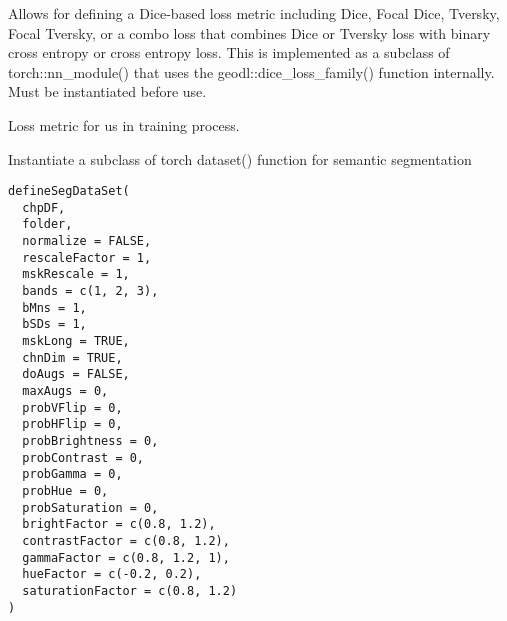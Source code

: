 \documentclass[a4paper]{book}
\begin{document}
%
\begin{Details}\relax
Allows for defining a Dice-based loss metric including Dice, Focal Dice,
Tversky, Focal Tversky, or a combo loss that combines Dice or Tversky loss
with binary cross entropy or cross entropy loss. This is implemented as a subclass
of torch::nn\_module() that uses the geodl::dice\_loss\_family() function internally. Must be
instantiated before use.
\end{Details}
%
\begin{Value}
Loss metric for us in training process.
\end{Value}
%
\begin{Description}\relax
Instantiate a subclass of torch dataset() function for semantic segmentation
\end{Description}
%
\begin{Usage}
\begin{verbatim}
defineSegDataSet(
  chpDF,
  folder,
  normalize = FALSE,
  rescaleFactor = 1,
  mskRescale = 1,
  bands = c(1, 2, 3),
  bMns = 1,
  bSDs = 1,
  mskLong = TRUE,
  chnDim = TRUE,
  doAugs = FALSE,
  maxAugs = 0,
  probVFlip = 0,
  probHFlip = 0,
  probBrightness = 0,
  probContrast = 0,
  probGamma = 0,
  probHue = 0,
  probSaturation = 0,
  brightFactor = c(0.8, 1.2),
  contrastFactor = c(0.8, 1.2),
  gammaFactor = c(0.8, 1.2, 1),
  hueFactor = c(-0.2, 0.2),
  saturationFactor = c(0.8, 1.2)
)
\end{verbatim}
\end{Usage}
%
\end{document}
